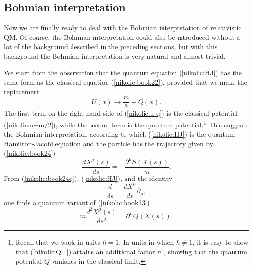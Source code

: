 \documentclass[12pt,twoside]{report} %
\begin{document}
\subsection{Bohmian interpretation}

Now we are finally ready to deal with the Bohmian interpretation of relativistic QM.
Of course, the Bohmian interpretation could also be introduced without a lot of the background described in the preceding sections, but with this background the Bohmian interpretation
is very natural and almost trivial.

We start from the observation that the quantum equation (\ref{nikolic:HJ}) has the same form
as the classical equation (\ref{nikolic:book22}), provided that we make the replacement
\begin{equation}\label{nikolic:u-q}
 U(x)\rightarrow\frac{m}{2}+Q(x) .
\end{equation}
The first term on the right-hand side of (\ref{nikolic:u-q})
is the classical potential (\ref{nikolic:u=m/2}), while the second
term is the quantum potential.\footnote{Recall that we work in units $\hbar=1$. 
In units in which $\hbar\neq 1$, it is easy to show that (\ref{nikolic:Q=}) attains an additional factor
$\hbar^2$, showing that the quantum potential $Q$ vanishes in the classical limit.}
This suggests the Bohmian interpretation, according to which (\ref{nikolic:HJ}) is the quantum
Hamilton-Jacobi equation and the particle has the trajectory given by (\ref{nikolic:book24})
\begin{equation}\label{nikolic:book24q}
 \frac{dX^{\mu}(s)}{ds}=-\frac{\partial^{\mu}S(X(s))}{m} .
\end{equation}
From (\ref{nikolic:book24q}), (\ref{nikolic:HJ}), and the identity
\begin{equation}
\frac{d}{ds}=\frac{dX^{\mu}}{ds}\partial_{\mu} ,
\end{equation}
one finds a quantum variant of (\ref{nikolic:book13})
\begin{equation}\label{nikolic:book13q}
 m\frac{d^2X^{\mu}(s)}{ds^2}=\partial^{\mu}Q(X(s)) .
\end{equation}
\end{document}
